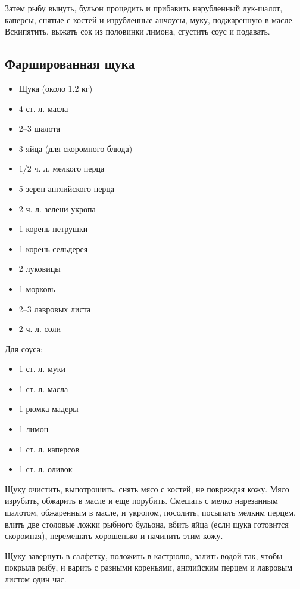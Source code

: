 Затем рыбу вынуть, бульон процедить и прибавить нарубленный лук-шалот, каперсы, снятые с костей и изрубленные анчоусы, муку, поджаренную в масле. Вскипятить, выжать сок из половинки лимона, сгустить соус и подавать.

\subsection{Фаршированная щука}

\begin{itemize}
	\item Щука (около 1.2 кг) 
    \item 4 ст. л. масла
    \item 2–3 шалота
    \item 3 яйца (для скоромного блюда)
    \item 1/2 ч. л. мелкого перца
    \item 5 зерен английского перца 
    \item 2 ч. л. зелени укропа 
    \item 1 корень петрушки
    \item 1 корень сельдерея
    \item 2 луковицы
    \item 1 морковь 
    \item 2–3 лавровых листа
    \item 2 ч. л. соли
\end{itemize}

Для соуса: 
\begin{itemize}
	\item 1 ст. л. муки
    \item 1 ст. л. масла
    \item 1 рюмка мадеры
    \item 1 лимон 
    \item 1 ст. л. каперсов 
    \item 1 ст. л. оливок
\end{itemize}

Щуку очистить, выпотрошить, снять мясо с костей, не повреждая кожу. Мясо изрубить, обжарить в масле и еще порубить. Смешать с мелко нарезанным шалотом, обжаренным в масле, и укропом, посолить, посыпать мелким перцем, влить две столовые ложки рыбного бульона, вбить яйца (если щука готовится скоромная), перемешать хорошенько и начинить этим кожу.

Щуку завернуть в салфетку, положить в кастрюлю, залить водой так, чтобы покрыла рыбу, и варить с разными кореньями, английским перцем и лавровым листом один час.

